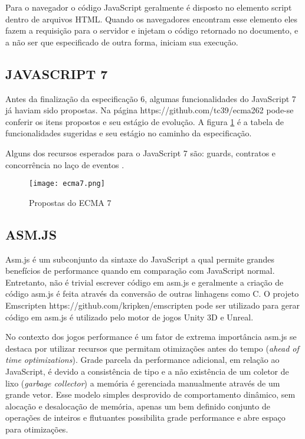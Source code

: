 Para o navegador o código JavaScript geralmente é disposto no elemento
script dentro de arquivos HTML. Quando os navegadores encontram esse
elemento eles fazem a requisição para o servidor e injetam o código
retornado no documento, e a não ser que especificado de outra forma,
iniciam sua execução.

\subsection{JAVASCRIPT 7}

Antes da finalização da especificação 6, algumas funcionalidades
do JavaScript 7 já haviam sido propostas. Na página
https://github.com/tc39/ecma262 pode-se conferir os itens propostos e
seu estágio de evolução. A figura \ref{fig:ecma7} é a tabela de
funcionalidades sugeridas e seu estágio no caminho da especificação.

Alguns dos recursos esperados para o JavaScript 7 são: guards,
contratos e concorrência no laço de eventos \autocite{ecma7}.

\begin{figure}[H]
    \centering
    \texttt{[image: ecma7.png]}
	\caption{Propostas do ECMA 7}
    \label{fig:ecma7}
\end{figure}

\subsection{ASM.JS}%

Asm.js é um subconjunto da sintaxe do JavaScript a qual permite
grandes benefícios de performance quando em comparação com
JavaScript normal. Entretanto, não é trivial escrever código em
asm.js e geralmente a criação de código asm.js é feita através
da conversão de outras linhagens como C. O projeto Emscripten
https://github.com/kripken/emscripten pode ser utilizado para gerar
código em asm.js é utilizado pelo motor de jogos Unity 3D e Unreal.

No contexto dos jogos performance é um fator de extrema importância
asm.js se destaca por utilizar recursos que permitam otimizações
antes do tempo (\textit{ahead of time optimizations}). Grade parcela
da performance adicional, em relação ao JavaScript, é devido a
consistência de tipo e a não existência de um coletor de lixo
(\textit{garbage collector}) a memória é gerenciada manualmente
através de um grande vetor. Esse modelo simples desprovido de
comportamento dinâmico, sem alocação e desalocação de memória,
apenas um bem definido conjunto de operações de inteiros e flutuantes
possibilita grade performance e abre espaço para otimizações.

